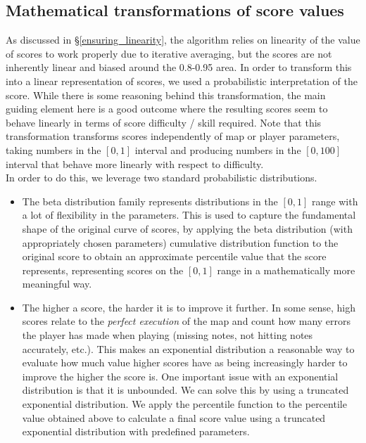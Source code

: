 \documentclass[12pt,a4paper]{article}
\begin{document}
\subsection{Mathematical transformations of score values}
\label{transformation_scores}

As discussed in \S \ref{ensuring_linearity}, the algorithm relies on linearity of the value of scores to work properly due to iterative averaging, but the scores are not inherently linear and biased around the 0.8-0.95 area. In order to transform this into a linear representation of scores, we used a probabilistic interpretation of the score. While there is some reasoning behind this transformation, the main guiding element here is a good outcome where the resulting scores seem to behave linearly in terms of score difficulty / skill required. Note that this transformation transforms scores independently of map or player parameters, taking numbers in the $[0,1]$ interval and producing numbers in the $[0,100]$ interval that behave more linearly with respect to difficulty.\\

In order to do this, we leverage two standard probabilistic distributions.

\begin{itemize}

\item The beta distribution family represents distributions in the $[0,1]$ range with a lot of flexibility in the parameters. This is used to capture the fundamental shape of the original curve of scores, by applying the beta distribution (with appropriately chosen parameters) cumulative distribution function to the original score to obtain an approximate percentile value that the score represents, representing scores on the $[0,1]$ range in a mathematically more meaningful way.

\item The higher a score, the harder it is to improve it further. In some sense, high scores relate to the {\emph{perfect execution}} of the map and count how many errors the player has made when playing (missing notes, not hitting notes accurately, etc.). This makes an exponential distribution a reasonable way to evaluate how much value higher scores have as being increasingly harder to improve the higher the score is. One important issue with an exponential distribution is that it is unbounded. We can solve this by using a truncated exponential distribution. We apply the percentile function to the percentile value obtained above to calculate a final score value using a truncated exponential distribution with predefined parameters.

\end{itemize}
\end{document}
